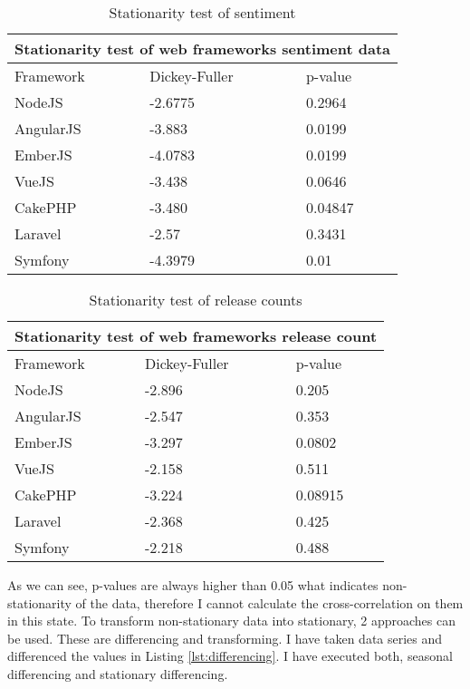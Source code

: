 \begin{table}[H]
\centering
\begin{tabular}{ |p{3cm}||p{3cm}|p{3cm}|  }
 \hline
 \multicolumn{3}{|c|}{Stationarity test of web frameworks sentiment data} \\
 \hline
 Framework & Dickey-Fuller & p-value\\
 \hline
 NodeJS   & -2.6775    &0.2964\\ \hline
 AngularJS &   -3.883  & 0.0199\\ \hline
 EmberJS & -4.0783 & 0.0199\\ \hline
 VueJS    &-3.438 & 0.0646\\ \hline
 CakePHP&   -3.480  & 0.04847\\ \hline
 Laravel& -2.57  & 0.3431\\ \hline
 Symfony& -4.3979  & 0.01\\ \hline
\end{tabular}
\caption{Stationarity test of sentiment}
\label{table:stationarity_table_sentiment}
\end{table}

\begin{table}[H]
\centering
\begin{tabular}{ |p{3cm}||p{3cm}|p{3cm}|  }
 \hline
 \multicolumn{3}{|c|}{Stationarity test of web frameworks release count} \\
 \hline
 Framework & Dickey-Fuller & p-value\\
 \hline
 NodeJS   & -2.896    &0.205\\ \hline
 AngularJS &   -2.547  & 0.353\\ \hline
 EmberJS & -3.297 & 0.0802\\ \hline
 VueJS    &-2.158 & 0.511\\ \hline
 CakePHP&   -3.224  & 0.08915\\ \hline
 Laravel& -2.368  & 0.425\\ \hline
 Symfony& -2.218  & 0.488\\ \hline
\end{tabular}
\caption{Stationarity test of release counts}
\label{table:stationarity_table_release_count}
\end{table}

As we can see, p-values are always higher than 0.05 what indicates non-stationarity of the data, therefore I cannot calculate the cross-correlation on them in this state. To transform non-stationary data into stationary, 2 approaches can be used. These are differencing and transforming.  I have taken data series and differenced the values in Listing \ref{lst:differencing}. I have executed both, seasonal differencing and stationary differencing.

